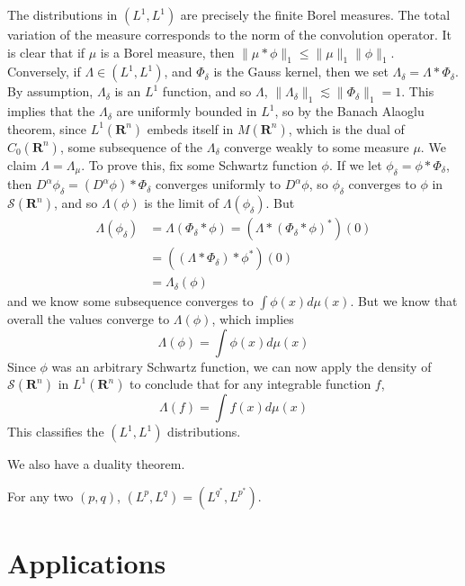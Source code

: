 \begin{example}
	The distributions in $(L^1, L^1)$ are precisely the finite Borel measures. The total variation of the measure corresponds to the norm of the convolution operator. It is clear that if $\mu$ is a Borel measure, then $\| \mu * \phi \|_1 \leq \| \mu \|_1 \| \phi \|_1$. Conversely, if $\Lambda \in (L^1, L^1)$, and $\Phi_\delta$ is the Gauss kernel, then we set $\Lambda_\delta = \Lambda * \Phi_\delta$. By assumption, $\Lambda_\delta$ is an $L^1$ function, and so $\Lambda$, $\| \Lambda_\delta \|_1 \lesssim \| \Phi_\delta \|_1 = 1$. This implies that the $\Lambda_\delta$ are uniformly bounded in $L^1$, so by the Banach Alaoglu theorem, since $L^1(\mathbf{R}^n)$ embeds itself in $M(\mathbf{R}^n)$, which is the dual of $C_0(\mathbf{R}^n)$, some subsequence of the $\Lambda_\delta$ converge weakly to some measure $\mu$. We claim $\Lambda = \Lambda_\mu$. To prove this, fix some Schwartz function $\phi$. If we let $\phi_\delta = \phi * \Phi_\delta$, then $D^\alpha \phi_\delta = (D^\alpha \phi) * \Phi_\delta$ converges uniformly to $D^\alpha \phi$, so $\phi_\delta$ converges to $\phi$ in $\mathcal{S}(\mathbf{R}^n)$, and so $\Lambda(\phi)$ is the limit of $\Lambda(\phi_\delta)$. But
	\begin{align*}
		\Lambda(\phi_\delta) &= \Lambda(\Phi_\delta * \phi) = (\Lambda * (\Phi_\delta * \phi)^*)(0)\\
		&= ((\Lambda * \Phi_\delta) * \phi^*)(0)\\
		&= \Lambda_\delta(\phi)
	\end{align*}
	and we know some subsequence converges to $\int \phi(x) d\mu(x)$. But we know that overall the values converge to $\Lambda(\phi)$, which implies
	\[ \Lambda(\phi) = \int \phi(x) d\mu(x) \]
	Since $\phi$ was an arbitrary Schwartz function, we can now apply the density of $\mathcal{S}(\mathbf{R}^n)$ in $L^1(\mathbf{R}^n)$ to conclude that for any integrable function $f$,
	\[ \Lambda(f) = \int f(x) d\mu(x) \]
	This classifies the $(L^1, L^1)$ distributions.
\end{example}

We also have a duality theorem.

\begin{theorem}
	For any two $(p,q)$, $(L^p,L^q) = (L^{q^*}, L^{p^*})$.
\end{theorem}

\chapter{Applications}

